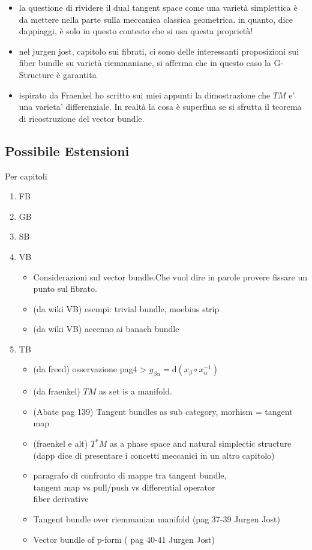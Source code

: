 \documentclass[a4paper,12pt]{scrartcl}    %
\begin{document}
\begin{proposition}
\begin{itemize}
\item la questione di rividere il dual tangent space come una varietà simplettica è da mettere nella parte sulla meccanica classica geometrica. in quanto, dice dappiaggi, è solo in questo contesto che si usa questa proprietà!

\item nel jurgen jost, capitolo sui fibrati, ci sono delle interessanti proposizioni sui fiber bundle su varietà riemmaniane, si afferma che in questo caso la G-Structure è garantita

\item ispirato da Fraenkel ho scritto sui miei appunti la dimostrazione che $TM$ e' una varieta' differenziale. In realtà la cosa è superflua se si sfrutta il teorema di ricostruzione del vector bundle.

\end{itemize}


\subsection{Possibile Estensioni}
Per capitoli
\begin{enumerate}
\item FB

\item GB

\item SB

\item VB
	\begin{itemize}
		 \item Considerazioni sul vector bundle.Che vuol dire in parole provere fissare un punto sul fibrato.
		 \item (da wiki VB) esempi: trivial bundle, moebius strip
		 \item (da wiki VB) accenno ai banach bundle
	\end{itemize}

\item TB
	\begin{itemize}
		 \item (da freed) osservazione pag4 > $g_{\beta \alpha} = \textrm{d} ( x_\beta \circ x_\alpha^{-1})$
		 \item (da fraenkel) $TM$ as set is a manifold.
		 \item (Abate pag 139) Tangent bundles as sub category, morhism = tangent map
		 \item (fraenkel e alt) $T^*M$ as a phase space and natural simplectic structure (dapp dice di presentare i concetti meccanici in un altro capitolo)
		 \item paragrafo di confronto di mappe tra tangent bundle,\\ tangent map vs pull/push vs differential operator \\ fiber derivative 
		 \item Tangent bundle over riemmanian manifold (pag 37-39 Jurgen Jost)
		 \item Vector bundle of p-form ( pag 40-41 Jurgen Jost)
	\end{itemize}


\end{enumerate}
\end{proposition}
\end{document}
